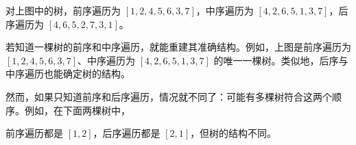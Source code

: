 对上图中的树，前序遍历为 $[1,2,4,5,6,3,7]$，中序遍历为 $[4,2,6,5,1,3,7]$，后序遍历为 $[4,6,5,2,7,3,1]$。

若知道一棵树的前序和中序遍历，就能重建其准确结构。例如，上图是前序遍历为 $[1,2,4,5,6,3,7]$、中序遍历为 $[4,2,6,5,1,3,7]$ 的唯一一棵树。类似地，后序与中序遍历也能确定树的结构。

然而，如果只知道前序和后序遍历，情况就不同了：可能有多棵树符合这两个顺序。例如，在下面两棵树中，
\begin{center}
\end{center}
前序遍历都是 $[1,2]$，后序遍历都是 $[2,1]$，但树的结构不同。
